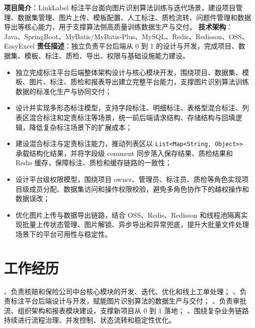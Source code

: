 \documentclass[11pt]{resume}
\begin{document}
\newline \textbf{项目简介}：LinkLabel 标注平台面向图片识别算法训练与迭代场景，建设项目管理、数据集管理、图片上传、模板配置、人工标注、质检流转、问题件管理和数据导出等核心能力，用于支撑算法侧高质量训练数据生产与交付。
\newline \textbf{技术架构}：Java、SpringBoot、MyBatis/MyBatis-Plus、MySQL、Redis、Redisson、OSS、EasyExcel
\newline \textbf{责任描述}：独立负责平台后端从 0 到 1 的设计与开发，完成项目、数据集、模板、标注、质检、导出、权限与基础设施能力建设。
\begin{itemize}
    \item 独立完成标注平台后端整体架构设计与核心模块开发，围绕项目、数据集、模板、图片、标注、质检和报表导出建立完整平台能力，支撑图片识别算法训练数据的标准化生产与协同交付；
    \item 设计并实现多形态标注模型，支持字段标注、明细标注、表格型混合标注、列表区混合标注和定责标注等场景，统一前后端请求结构、存储结构与回填逻辑，降低复杂标注场景下的扩展成本；
    \item 建设混合标注与定责标注能力，推动列表区以 \texttt{List<Map<String, Object>>} 承载结构化结果，并将字段级 comment 同步落入保存结果、质检结果和 Redis 缓存，保障标注、质检和缓存链路的一致性；
    \item 设计平台级权限模型，围绕项目 owner、管理员、标注员、质检等角色实现项目级成员分配、数据集访问和操作权限校验，避免多角色协作下的越权操作和数据误改；
    \item 优化图片上传与数据导出链路，结合 OSS、Redis、Redisson 和线程池隔离实现批量上传状态管理、图片解锁、异步导出和异常兜底，提升大批量文件处理场景下的平台可用性与稳定性。
\end{itemize}

\section{工作经历}
、负责核赔和保险公司中台核心模块的开发、迭代、优化和线上工单处理；
、负责标注平台后端设计与开发，赋能图片识别算法的数据生产与交付；
、负责审批流、组织架构和报表模块建设，支撑新项目从 0 到 1 落地；
、围绕复杂业务链路持续进行流程治理、并发控制、状态流转和稳定性优化。
\end{document}
